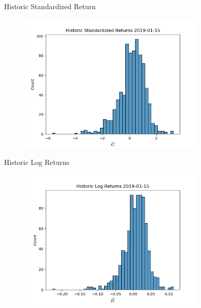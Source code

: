 \documentclass[9pt]{beamer}
\begin{document}
\begin{frame}{Historic Standardized Return}
\begin{center}
\begin{figure}
    \includegraphics[width=9cm]{SR_20190115.png}
\end{figure}
\end{center}
\end{frame}

\begin{frame}{Historic Log Returns}
\begin{center}
\begin{figure}
    \includegraphics[width=9cm]{RR_20190115.png}
\end{figure}
\end{center}
\end{frame}
\end{document}
